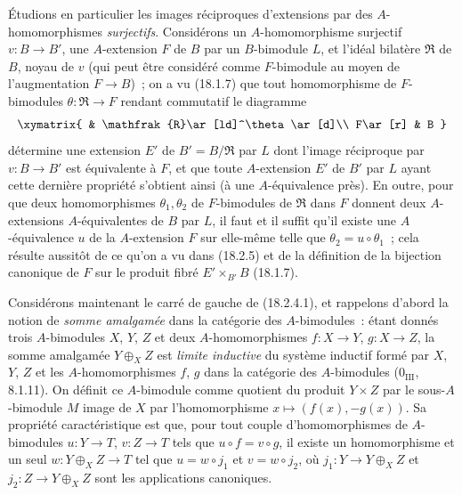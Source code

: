 \begin{env}[18.2.6]
\label{0.18.2.6-fr}
Étudions en particulier les images réciproques d'extensions par des
$A$-homomorphismes \emph{surjectifs}. Considérons un $A$-homomorphisme
surjectif $v:B\to B'$, une $A$-extension $F$ de $B$ par un $B$-bimodule $L$,
et l'idéal bilatère $\mathfrak{R}$ de $B$, noyau de $v$ (qui peut être
considéré comme $F$-bimodule au moyen de l'augmentation $F\to B$)~; on a vu
(18.1.7) que tout homomorphisme de $F$-bimodules
$\theta:\mathfrak{R}\to F$ rendant commutatif le diagramme
\[
  \xymatrix{
    & \mathfrak{R}\ar[ld]^\theta\ar[d]\\
    F\ar[r] & B
  }
\]
détermine une extension $E'$ de $B'=B/\mathfrak{R}$ par $L$ dont l'image
réciproque par $v:B\to B'$ est équivalente à $F$, et que toute $A$-extension
$E'$ de $B'$ par $L$ ayant cette dernière propriété s'obtient ainsi (à une
$A$-équivalence près). En outre, pour que deux homomorphismes
$\theta_1,\theta_2$ de $F$-bimodules de $\mathfrak{R}$ dans $F$ donnent deux
  $A$-extensions $A$-équivalentes de $B$ par $L$, il faut et il suffit qu'il
existe une $A$-équivalence $u$ de la $A$-extension $F$ sur elle-même telle que
$\theta_2=u\circ\theta_1$~; cela résulte aussitôt de ce qu'on a vu dans
(18.2.5) et de la définition de la bijection canonique de $F$ sur le produit
fibré $E'\times_{B'}B$ (18.1.7).
\end{env}

\begin{env}[18.2.7]
\label{0.18.2.7-fr}
Considérons maintenant le carré de gauche de (18.2.4.1), et rappelons d'abord
la notion de \emph{somme amalgamée} dans la catégorie des $A$-bimodules~:
étant donnés trois $A$-bimodules $X$, $Y$, $Z$ et deux $A$-homomorphismes
$f:X\to Y$, $g:X\to Z$, la somme amalgamée $Y\oplus_XZ$ est \emph{limite
inductive} du système inductif formé par $X$, $Y$, $Z$ et les
$A$-homomorphismes $f$, $g$ dans la catégorie des $A$-bimodules
($0_{\mathrm{III}}$, 8.1.11). On définit ce $A$-bimodule comme quotient du
produit $Y\times Z$ par le sous-$A$-bimodule $M$ image de $X$ par
l'homomorphisme $x\mapsto(f(x),-g(x))$. Sa propriété caractéristique est que,
pour tout couple d'homomorphismes de $A$-bimodules $u:Y\to T$, $v:Z\to T$
tels que $u\circ f=v\circ g$, il existe un homomorphisme et un seul
$w:Y\oplus_XZ\to T$ tel que $u=w\circ j_1$ et $v=w\circ j_2$, où
$j_1:Y\to Y\oplus_XZ$ et $j_2:Z\to Y\oplus_XZ$ sont les applications
canoniques.
\end{env}

